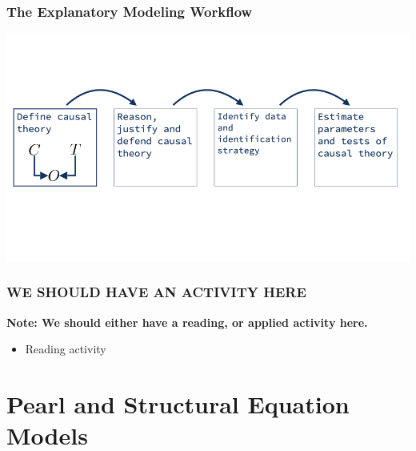 \documentclass[12pt, block=fill]{beamer}
\begin{document}
\begin{frame}
  \frametitle{The Explanatory Modeling Workflow}


  \centering
  \includegraphics[width = \textwidth]{images/explanatory_workflow/explanatory_workflow_001.png}
\end{frame}

\begin{frame}
  \frametitle{WE SHOULD HAVE AN ACTIVITY HERE}
  \textbf{Note: We should either have a reading, or applied activity
    here.}
  \begin{itemize}
  \item Reading activity 
  \end{itemize}
\end{frame} 


\section{Pearl and Structural Equation Models}
\end{document}
